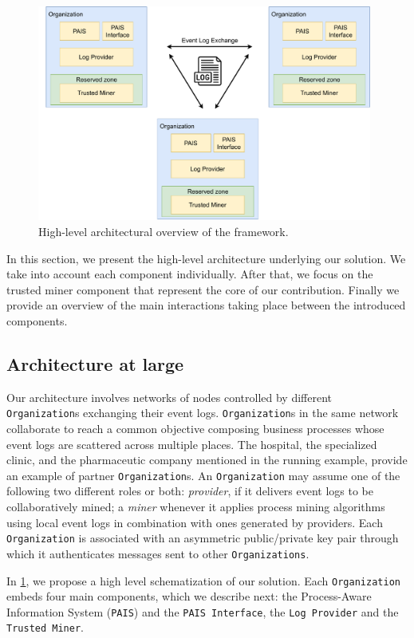 \begin{figure}[t]
\centering
\includegraphics[width=11cm]{content/figures/architecture_diagram.pdf}
\caption{High-level architectural overview of the framework.}
\label{fig:architecture_diagram}
\end{figure}
In this section, we present the high-level architecture underlying our solution. We take into account each component individually. After that, we focus on the trusted miner component that represent the core of our contribution. Finally we provide an overview of the main interactions taking place between the introduced components.

\subsection{Architecture at large}
Our architecture involves networks of nodes controlled by different \texttt{Organization}s exchanging their event logs. \texttt{Organization}s in the same network collaborate to reach a common objective composing business processes whose event logs are scattered across multiple places. The hospital, the specialized clinic, and the pharmaceutic company mentioned in the running example, provide an example of partner \texttt{Organization}s. An \texttt{Organization} may assume one of the following two different roles or both: \textit{provider}, if it delivers event logs to be collaboratively mined; a \textit{miner} whenever it applies process mining algorithms using local event logs in combination with ones generated by providers. Each \texttt{Organization} is associated with an asymmetric public/private key pair through which it authenticates messages sent to other \texttt{Organizations}.

In \cref{fig:architecture_diagram}, we propose a high level schematization of our solution. Each \texttt{Organization} embeds four main components, which we describe next: the Process-Aware Information System (\texttt{PAIS}) and the \texttt{PAIS Interface}, the \texttt{Log Provider} and the \texttt{Trusted Miner}.


